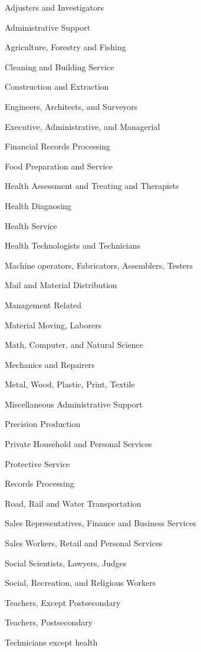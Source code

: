 \documentclass[12pt]{article}
\begin{document}
   
   Adjusters and Investigators
   
   Administrative Support
   
   Agriculture, Forestry and Fishing
   
   Cleaning and Building Service 
   
   Construction and Extraction
   
   Engineers, Architects, and Surveyors
   
   Executive, Administrative, and Managerial
   
   Financial Records Processing 
   
   Food Preparation and Service 
   
   Health Assessment and Treating and Therapists
   
   Health Diagnosing
   
   Health Service
   
   Health Technologists and Technicians
   
   Machine operators, Fabricators, Assemblers, Testers
   
   Mail and Material Distribution
   
   Management Related
   
   Material Moving, Laborers
   
   Math, Computer, and Natural Science
   
   Mechanics and Repairers
   
   Metal, Wood, Plastic, Print, Textile
   
   Miscellaneous Administrative Support
   
   Precision Production
   
   Private Household and Personal Services
   
   Protective Service
   
   Records Processing
   
   Road, Rail and Water Transportation
   
   Sales Representatives, Finance and Business Services
   
   Sales Workers, Retail and Personal Services
   
   Social Scientists, Lawyers, Judges
   
   Social, Recreation, and Religious Workers
   
   Teachers, Except Postsecondary
   
   Teachers, Postsecondary
   
   Technicians except health
   
\end{document}
